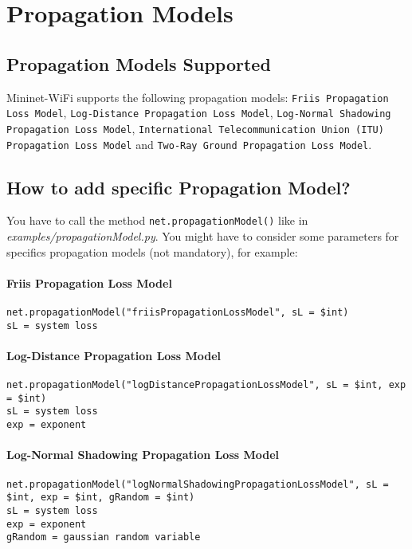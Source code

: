 \chapter{Propagation Models}
\section{Propagation Models Supported}
Mininet-WiFi supports the following propagation models: \texttt{Friis Propagation Loss Model}, \texttt{Log-Distance Propagation Loss Model}, \texttt{Log-Normal Shadowing Propagation Loss Model}, \texttt{International Telecommunication Union (ITU) Propagation Loss Model} and \texttt{Two-Ray Ground Propagation Loss Model}.

\section{How to add specific Propagation Model?}
You have to call the method \texttt{net.propagationModel()} like in \textit{examples/propagationModel.py}. You might have to consider some parameters for specifics propagation models (not mandatory), for example:

\subsubsection{Friis Propagation Loss Model}
\begin{verbatim}
net.propagationModel("friisPropagationLossModel", sL = $int) 
sL = system loss
\end{verbatim}

\subsubsection{Log-Distance Propagation Loss Model}
\begin{verbatim}
net.propagationModel("logDistancePropagationLossModel", sL = $int, exp = $int) 
sL = system loss
exp = exponent
\end{verbatim}

\subsubsection{Log-Normal Shadowing Propagation Loss Model}
\begin{verbatim}
net.propagationModel("logNormalShadowingPropagationLossModel", sL = $int, exp = $int, gRandom = $int) 
sL = system loss
exp = exponent
gRandom = gaussian random variable
\end{verbatim}

